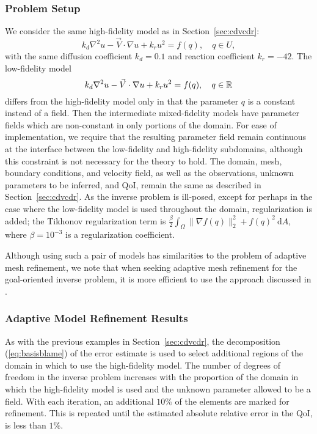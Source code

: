 \subsubsection{Problem Setup}
We consider the same high-fidelity model as in Section~\ref{sec:cdvcdr}:
\begin{equation}
k_d\nabla^2 u - \vec{V}\cdot\nabla u + k_ru^2= f(q),\quad q\in U,
\end{equation}
with the same diffusion coefficient $k_d = 0.1$  and reaction coefficient $k_r = -42$. The low-fidelity model
\begin{equation}
k_d\nabla^2 u - \vec{V}\cdot\nabla u + k_ru^2= f(q),\quad q\in{\mathbb{R}}
\end{equation}
differs from the high-fidelity model only in that the parameter $q$ is a constant instead of a field. Then the intermediate mixed-fidelity models have parameter fields which are non-constant in only portions of the domain. For ease of implementation, we require that the resulting parameter field remain continuous at the interface between the low-fidelity and high-fidelity subdomains, although this constraint is not necessary for the theory to hold. The domain, mesh, boundary conditions, and velocity field, as well as the observations, unknown parameters to be inferred, and QoI, remain the same as described in Section~\ref{sec:cdvcdr}. As the inverse problem is ill-posed, except for perhaps in the case where the low-fidelity model is used throughout the domain, regularization is added; the Tikhonov regularization term is $\frac{\beta}{2}\int_\Omega \|\nabla f(q)\|_2^2+f(q)^2\:\textrm{d}A$, where $\beta=10^{-3}$ is a regularization coefficient.

Although using such a pair of models has similarities to the problem of adaptive mesh refinement, we note that when seeking adaptive mesh refinement for the goal-oriented inverse problem, it is more efficient to use the approach discussed in \cite{BecVex05}.
\subsubsection{Adaptive Model Refinement Results}
As with the previous examples in Section~\ref{sec:cdvcdr}, the decomposition (\ref{eq:basisblame}) of the error estimate is used to select additional regions of the domain in which to use the high-fidelity model. The number of degrees of freedom in the inverse problem increases with the proportion of the domain in which the high-fidelity model is used and the unknown parameter allowed to be a field. With each iteration, an additional $10\%$ of the elements are marked for refinement. This is repeated until the estimated absolute relative error in the QoI, is less than $1\%$.

